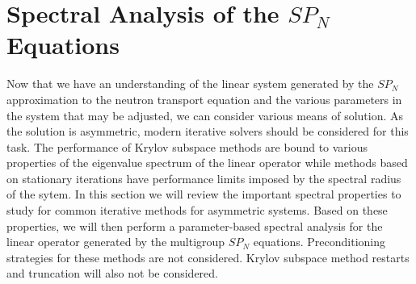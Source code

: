 \documentclass[letterpaper,12pt]{article}
\begin{document}
\section{Spectral Analysis of the $SP_N$ Equations}
\label{sec:spectral_analysis}
Now that we have an understanding of the linear system generated by
the $SP_N$ approximation to the neutron transport equation and the
various parameters in the system that may be adjusted, we can consider
various means of solution. As the solution is asymmetric, modern
iterative solvers should be considered for this task. The performance
of Krylov subspace methods are bound to various properties of the
eigenvalue spectrum of the linear operator while methods based on
stationary iterations have performance limits imposed by the spectral
radius of the sytem. In this section we will review the important
spectral properties to study for common iterative methods for
asymmetric systems. Based on these properties, we will then perform a
parameter-based spectral analysis for the linear operator generated by
the multigroup $SP_N$ equations. Preconditioning strategies for these
methods are not considered. Krylov subspace method restarts and
truncation will also not be considered.
\end{document}
